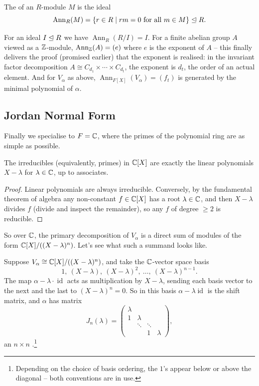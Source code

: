 \documentclass[a4paper]{scrartcl}
\begin{document}
\begin{definition}[Annihilator]
	The  of an $R$-module $M$ is the ideal
	$$
	\operatorname{Ann}_R(M) = \{r \in R \mid rm = 0 \text{ for all } m \in M\} \trianglelefteq R.
	$$
\end{definition}

\begin{example}
	For an ideal $I \trianglelefteq R$ we have $\operatorname{Ann}_R(R/I) = I$. For a finite abelian group $A$ viewed as a $\mathbb{Z}$-module, $\operatorname{Ann}_{\mathbb{Z}}(A) = (e)$ where $e$ is the exponent of $A$ -- this finally delivers the proof (promised earlier) that the exponent is realised: in the invariant factor decomposition $A \cong C_{d_1}\times \cdots \times C_{d_t}$, the exponent is $d_t$, the order of an actual element. And for $V_{\alpha}$ as above, $\operatorname{Ann}_{F[X]}(V_\alpha) = (f_t)$ is generated by the minimal polynomial of $\alpha$.
\end{example}

\subsection{Jordan Normal Form}

Finally we specialise to $F = \mathbb{C}$, where the primes of the polynomial ring are as simple as possible.

\begin{lemma}
	The irreducibles (equivalently, primes) in $\mathbb{C}[X]$ are exactly the linear polynomials $X - \lambda$ for $\lambda \in \mathbb{C}$, up to associates.
\end{lemma}
\begin{proof}
	Linear polynomials are always irreducible. Conversely, by the fundamental theorem of algebra any non-constant $f \in \mathbb{C}[X]$ has a root $\lambda \in \mathbb{C}$, and then $X - \lambda$ divides $f$ (divide and inspect the remainder), so any $f$ of degree $\geq 2$ is reducible.
\end{proof}

So over $\mathbb{C}$, the primary decomposition of $V_{\alpha}$ is a direct sum of modules of the form $\mathbb{C}[X]/((X - \lambda)^n)$. Let's see what such a summand looks like.

\begin{example}
	Suppose $V_{\alpha} \cong \mathbb{C}[X]/((X - \lambda)^n)$, and take the $\mathbb{C}$-vector space basis
	$$
	1,\ (X - \lambda),\ (X - \lambda)^2,\ \dots,\ (X - \lambda)^{n - 1}.
	$$
	The map $\alpha - \lambda \cdot \operatorname{id}$ acts as multiplication by $X - \lambda$, sending each basis vector to the next and the last to $(X - \lambda)^n = 0$. So in this basis $\alpha - \lambda\operatorname{id}$ is the shift matrix, and $\alpha$ has matrix
	$$
	J_n(\lambda) = \begin{pmatrix}
		\lambda & & & \\
		1 & \lambda & & \\
		& \ddots & \ddots & \\
		& & 1 & \lambda
	\end{pmatrix},
	$$
	an $n \times n$ .\footnote{Depending on the choice of basis ordering, the $1$'s appear below or above the diagonal -- both conventions are in use.}
\end{example}
\end{document}

